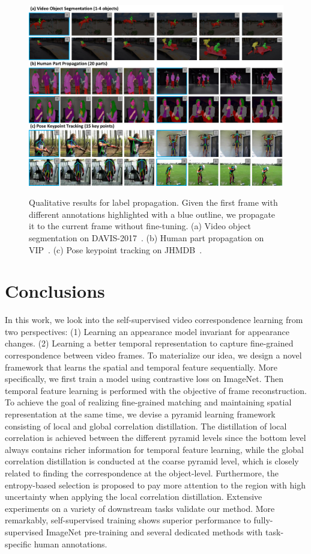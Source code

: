 \documentclass{article}
\begin{document}
\begin{figure}[!tb]
  \centering
  {\includegraphics[width=1.0\textwidth]{figure/quantitative_results/quan.pdf}}
  \caption{\small Qualitative results for label propagation. Given the first frame with different annotations highlighted with a blue outline, we propagate it to the current frame without fine-tuning. (a) Video object segmentation on DAVIS-2017~\cite{pont20172017}. (b) Human part propagation on VIP~\cite{zhou2018adaptive}. (c) Pose keypoint tracking on JHMDB~\cite{jhuang2013towards}. }
  \label{fig:quan}
  \vspace{-4mm}
\end{figure}

\section{Conclusions}
In this work, we look into the self-supervised video correspondence learning from two perspectives: (1) Learning an appearance model invariant for appearance changes. (2) Learning a better temporal representation to capture fine-grained correspondence between video frames. To materialize our idea, we design a novel framework that learns the spatial and temporal feature sequentially. More specifically, we first train a model using contrastive loss on ImageNet. Then temporal feature learning is performed with the objective of frame reconstruction. To achieve the goal of realizing fine-grained matching and maintaining spatial representation at the same time, we devise a pyramid learning framework consisting of local and global correlation distillation. The distillation of local correlation is achieved between the different pyramid levels since the bottom level always contains richer information for temporal feature learning, while the global correlation distillation is conducted at the coarse pyramid level, which is closely related to finding the correspondence at the object-level. Furthermore, the entropy-based selection is proposed to pay more attention to the region with high uncertainty when applying the local correlation distillation. Extensive experiments on a variety of downstream tasks validate our method. More remarkably, self-supervised training shows superior performance to fully-supervised ImageNet pre-training and several dedicated methods with task-specific human annotations.
\end{document}
